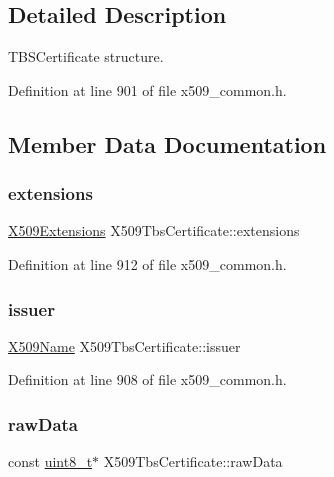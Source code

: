 \subsection{Detailed Description}
T\+B\+S\+Certificate structure. 

Definition at line 901 of file x509\+\_\+common.\+h.



\subsection{Member Data Documentation}
\mbox{\label{structX509TbsCertificate_aa60d8b8a952d01fd8de02c2da091563e}} 
\subsubsection{\texorpdfstring{extensions}{extensions}}
{\footnotesize\ttfamily \hyperlink{structX509Extensions}{X509\+Extensions} X509\+Tbs\+Certificate\+::extensions}



Definition at line 912 of file x509\+\_\+common.\+h.

\mbox{\label{structX509TbsCertificate_a8f9e1f73fbccfe993464a10bf6420a69}} 
\subsubsection{\texorpdfstring{issuer}{issuer}}
{\footnotesize\ttfamily \hyperlink{structX509Name}{X509\+Name} X509\+Tbs\+Certificate\+::issuer}



Definition at line 908 of file x509\+\_\+common.\+h.

\mbox{\label{structX509TbsCertificate_ace5ec9ea3582843c4e81cdbbe4c3d0aa}} 
\subsubsection{\texorpdfstring{raw\+Data}{rawData}}
{\footnotesize\ttfamily const \hyperlink{stdint_8h_aba7bc1797add20fe3efdf37ced1182c5}{uint8\+\_\+t}$\ast$ X509\+Tbs\+Certificate\+::raw\+Data}



